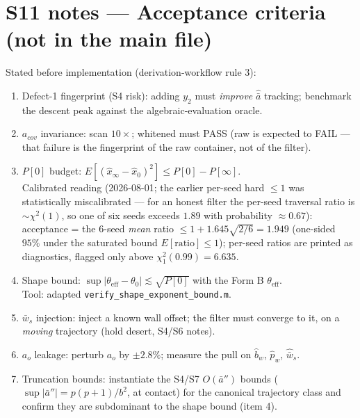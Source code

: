 \documentclass[11pt,a4paper,fontset=none]{ctexart}
\begin{document}
\section*{S11 notes --- Acceptance criteria (not in the main file)}

Stated before implementation (derivation-workflow rule 3):
\begin{enumerate}
\item Defect-1 fingerprint (S4 risk): adding $y_2$ must \emph{improve}
$\hat{\bar{a}}$ tracking; benchmark the descent peak against the
algebraic-evaluation oracle.
\item $a_{cov}$ invariance: scan $10\times$; whitened must PASS (raw is
expected to FAIL --- that failure is the fingerprint of the raw
container, not of the filter).
\item $P[0]$ budget:
$E[(\hat{x}_\infty-\hat{x}_0)^2] \leq P[0]-P[\infty]$.\\
Calibrated reading (2026-08-01; the earlier per-seed hard $\leq 1$ was
statistically miscalibrated --- for an honest filter the per-seed
traversal ratio is $\sim\chi^2(1)$, so one of six seeds exceeds $1.89$
with probability $\approx 0.67$): acceptance = the 6-seed \emph{mean}
ratio $\leq 1 + 1.645\sqrt{2/6} = 1.949$ (one-sided $95\%$ under the
saturated bound $E[\text{ratio}] \leq 1$); per-seed ratios are printed
as diagnostics, flagged only above $\chi^2_1(0.99) = 6.635$.
\item Shape bound: $\sup|\theta_{\mathrm{eff}}-\theta_0| \lesssim
\sqrt{P[0]}$ with the Form B $\theta_{\mathrm{eff}}$.\\
Tool: adapted \texttt{verify\_shape\_exponent\_bound.m}.
\item $\bar{w}_s$ injection: inject a known wall offset; the filter must
converge to it, on a \emph{moving} trajectory (hold desert, S4/S6 notes).
\item $a_o$ leakage: perturb $a_o$ by $\pm2.8\%$; measure the pull on
$\hat{b}_w$, $\hat{p}_w$, $\hat{\bar{w}}_s$.
\item Truncation bounds: instantiate the S4/S7 $O(\bar{a}'')$ bounds
($\sup|\bar{a}''| = p(p+1)/b^2$, at contact) for the canonical trajectory
class and confirm they are subdominant to the shape bound (item 4).
\end{enumerate}
\end{document}
